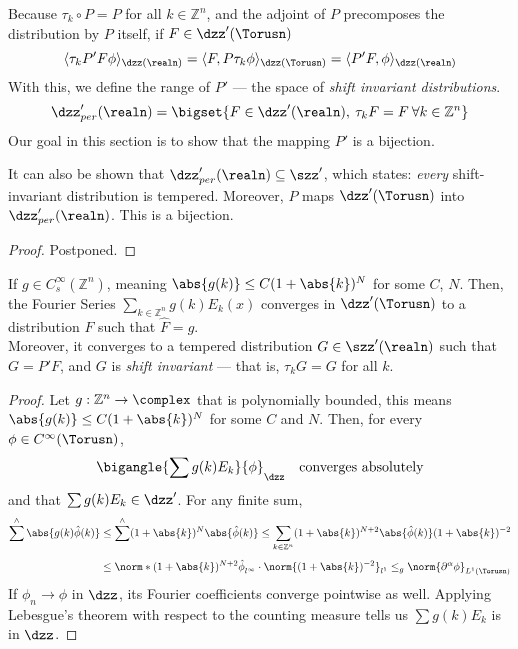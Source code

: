 \documentclass[../main-v2-manifolds.tex]{subfiles}
\begin{document}
Because $\tau_k\circ P = P$ for all $k\in\mathbb{Z}^n$, and the adjoint of $P$ precomposes the distribution by $P$ itself, if $F\in \dzz'(\Torusn)$
\[
    \langle{\tau_k P'F}{\phi}\rangle_{\dzz(\realn)}=\langle F, P\tau_k\phi\rangle_{\dzz(\Torusn)} = \langle P'F, \phi\rangle_{\dzz(\realn)}
\]
With this, we define the range of $P'$ --- the space of \emph{shift invariant distributions}.
\begin{equation}
\dzz'_{per}(\realn) = \bigset{F\in\dzz'(\realn),\: \tau_kF = F\: \forall k\in\mathbb{Z}^n}
\label{eq: shift-invariant distributions}
\end{equation}
Our goal in this section is to show that the mapping $P'$ is a bijection. 
\begin{lemma}
It can also be shown that $\dzz'_{per}(\realn)\subseteq\szz'$, which states: \emph{every} shift-invariant distribution is tempered. Moreover, $P$ maps $\dzz'(\Torusn)$ into $\dzz'_{per}(\realn)$. This is a bijection.    
\end{lemma}
\begin{proof}
    Postponed.
\end{proof}
\begin{lemma}
    If $g\in C_s^\infty(\mathbb{Z}^n)$, meaning $\abs{g(k)}\leq C(1+\abs{k})^N$ for some $C$, $N$. Then, the Fourier Series $\sum_{k\in\mathbb{Z}^n}g(k)E_{k}(x)$ converges in $\dzz'(\Torusn)$ to a distribution $F$ such that $\hat{F} = g$.\\

    Moreover, it converges to a tempered distribution $G\in \szz'(\realn)$ such that $G = P'F$, and $G$ is \emph{shift invariant} --- that is, $\tau_k G = G$ for all $k$.
\end{lemma}
\begin{proof}
    
    Let $g: \mathbb{Z}^n\to\complex$ that is polynomially bounded, this means $\abs{g(k)}\leq C(1+\abs{k})^{N}$ for some $C$ and $N$. Then, for every $\phi\in C^\infty(\Torusn)$, 
    \[
        \bigangle{\sum g(k)E_{k}}{\phi}_{\dzz} \quad\text{converges absolutely}
    \]
    and that $\sum g(k) E_k \in \dzz'$. For any finite sum,
    \begin{align*}
        \sum^\wedge\abs{g(k)\hat{\phi}(k)}&\leq \sum^\wedge (1+\abs{k})^N \abs{\hat{\phi}(k)}\leq \sum_{k\in\mathbb{Z}^n} (1+\abs{k})^{N+2}\abs{\hat{\phi}(k)}(1+\abs{k})^{-2} \\[1ex]
        &\leq \norm*{(1+\abs{k})^{N+2}\hat{\phi}}_{l^\infty}\cdot\norm{(1+\abs{k})^{-2}}_{l^1}\leq_{g} \norm{\partial^{\alpha}\phi}_{L^1(\Torusn)}
    \end{align*}
    If $\phi_n\to \phi$ in $\dzz$, its Fourier coefficients converge pointwise as well. Applying Lebesgue's theorem with respect to the counting measure tells us $\sum g(k) E_k$ is in $\dzz$.
\end{proof}
\end{document}

